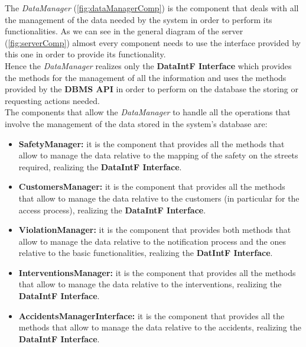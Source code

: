 			The \emph{DataManager} (\autoref{fig:dataManagerComp}) is the component that deals with all the management of the data needed by the system in order to perform its functionalities. As we can see in the general diagram of the server (\autoref{fig:serverComp}) almost every component needs to use the interface provided by this one in order to provide its functionality.\\
			
			Hence the \emph{DataManager} realizes only the \textbf{DataIntF Interface} which provides the methods for the management of all the information and uses the methods provided by the \textbf{DBMS API} in order to perform on the database the storing or requesting actions needed.\\
			
			The components that allow the \emph{DataManager} to handle all the operations that involve the management of the data stored in the system's database are:
			
			\begin{itemize}
				\item \textbf{SafetyManager:} it is the component that provides all the methods that allow to manage the data relative to the mapping of the safety on the streets required, realizing the \textbf{DataIntF Interface}.
				
				\item \textbf{CustomersManager:} it is the component that provides all the methods that allow to manage the data relative to the customers (in particular for the access process), realizing the \textbf{DataIntF Interface}. 
				
				\item \textbf{ViolationManager:} it is the component that provides both methods that allow to manage the data relative to the notification process and the ones relative to the basic functionalities, realizing the \textbf{DatIntF Interface}.
				
				\item \textbf{InterventionsManager:} it is the component that provides all the methods that allow to manage the data relative to the interventions, realizing the \textbf{DataIntF Interface}.
				
				\item \textbf{AccidentsManagerInterface:} it is the component that provides all the methods that allow to manage the data relative to the accidents, realizing the \textbf{DataIntF Interface}.
			\end{itemize}
		
